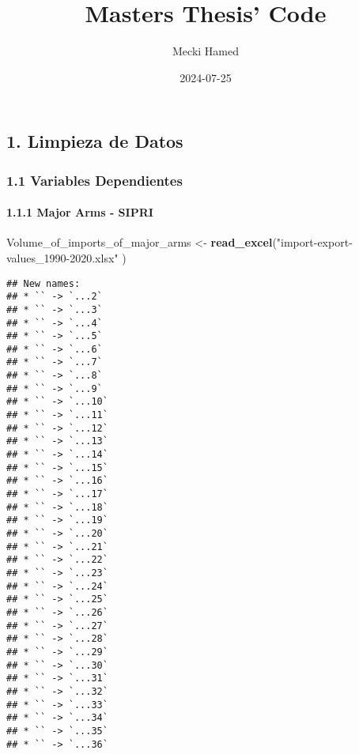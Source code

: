 \documentclass[
  11pt,
]{article}
\title{Masters Thesis' Code}
\author{Mecki Hamed}
\date{2024-07-25}
\newenvironment{Shaded}{\begin{snugshade}}{\end{snugshade}}
\newcommand{\FunctionTok}[1]{\textcolor[rgb]{0.13,0.29,0.53}{\textbf{#1}}}
\newcommand{\NormalTok}[1]{#1}
\newcommand{\OtherTok}[1]{\textcolor[rgb]{0.56,0.35,0.01}{#1}}
\newcommand{\StringTok}[1]{\textcolor[rgb]{0.31,0.60,0.02}{#1}}
\begin{document}
\maketitle

{
\setcounter{tocdepth}{2}
\tableofcontents
}
\subsection{1. Limpieza de Datos}\label{limpieza-de-datos}

\subsubsection{1.1 Variables Dependientes}\label{variables-dependientes}

\paragraph{1.1.1 Major Arms - SIPRI}\label{major-arms---sipri}

\begin{Shaded}
\begin{Highlighting}[]
\NormalTok{Volume\_of\_imports\_of\_major\_arms }\OtherTok{\textless{}{-}} \FunctionTok{read\_excel}\NormalTok{(}\StringTok{"import{-}export{-}values\_1990{-}2020.xlsx"}
\NormalTok{)}
\end{Highlighting}
\end{Shaded}

\begin{verbatim}
## New names:
## * `` -> `...2`
## * `` -> `...3`
## * `` -> `...4`
## * `` -> `...5`
## * `` -> `...6`
## * `` -> `...7`
## * `` -> `...8`
## * `` -> `...9`
## * `` -> `...10`
## * `` -> `...11`
## * `` -> `...12`
## * `` -> `...13`
## * `` -> `...14`
## * `` -> `...15`
## * `` -> `...16`
## * `` -> `...17`
## * `` -> `...18`
## * `` -> `...19`
## * `` -> `...20`
## * `` -> `...21`
## * `` -> `...22`
## * `` -> `...23`
## * `` -> `...24`
## * `` -> `...25`
## * `` -> `...26`
## * `` -> `...27`
## * `` -> `...28`
## * `` -> `...29`
## * `` -> `...30`
## * `` -> `...31`
## * `` -> `...32`
## * `` -> `...33`
## * `` -> `...34`
## * `` -> `...35`
## * `` -> `...36`
\end{verbatim}
\end{document}
